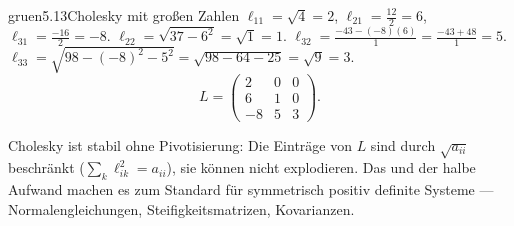 \begin{loesungkarte}{gruen}{5.13}{Cholesky mit großen Zahlen}
$\ell_{11} = \sqrt4 = 2$, $\ell_{21} = \frac{12}2 = 6$, $\ell_{31} = \frac{-16}2 = -8$.
$\ell_{22} = \sqrt{37 - 6^{2}} = \sqrt1 = 1$. $\ell_{32} = \frac{-43 - (-8)(6)}1 = \frac{-43 + 48}1 = 5$.
$\ell_{33} = \sqrt{98 - (-8)^{2} - 5^{2}} = \sqrt{98 - 64 - 25} = \sqrt9 = 3$.
\[ L = \begin{pmatrix}2 & 0 & 0\\ 6 & 1 & 0\\ -8 & 5 & 3\end{pmatrix}. \]
\begin{mitnehmen}\kastentext
Cholesky ist stabil ohne Pivotisierung: Die Einträge von $L$ sind durch $\sqrt{a_{ii}}$ beschränkt ($\sum_k\ell_{ik}^{2} = a_{ii}$), sie können nicht explodieren. Das und der halbe Aufwand machen es zum Standard für symmetrisch positiv definite Systeme --- Normalengleichungen, Steifigkeitsmatrizen, Kovarianzen.
\end{mitnehmen}
\end{loesungkarte}

